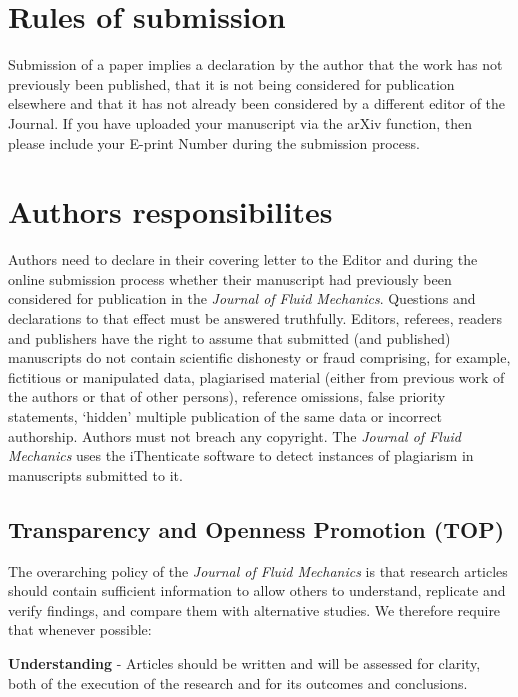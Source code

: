 \documentclass[lineno]{jfm}
\begin{document}
\section{Rules of submission}\label{sec:rules_submission}
 Submission of a paper implies a declaration by the author that the work has not previously been published, that it is not being considered for publication elsewhere and that it has not already been considered by a different editor of the Journal.  If you have uploaded your manuscript via the arXiv function, then please include your E-print Number during the submission process.

\section {Authors responsibilites}
 Authors need to declare in their covering letter to the Editor and during the online submission process whether their manuscript had previously been considered for publication in the {\it Journal of Fluid Mechanics}.  Questions and declarations to that effect must be answered truthfully.
Editors, referees, readers and publishers have the right to assume that submitted (and published) manuscripts do not contain scientific dishonesty or fraud comprising, for example, fictitious or manipulated data, plagiarised material (either from previous work of the authors or that of other persons), reference omissions, false priority statements, `hidden' multiple publication of the same data or incorrect authorship.  Authors must not breach any copyright.  The {\it Journal of Fluid Mechanics} uses the iThenticate software to detect instances of plagiarism in manuscripts submitted to it.
\subsection {Transparency and Openness Promotion (TOP)}
 The overarching policy of the {\it Journal of Fluid Mechanics} is that research articles should contain sufficient information to allow others to understand, replicate and verify findings, and compare them with alternative studies. We therefore require that whenever possible:

 {\bf Understanding} - Articles should be written and will be assessed for clarity, both of the execution of the research and for its outcomes and conclusions.
\end{document}

